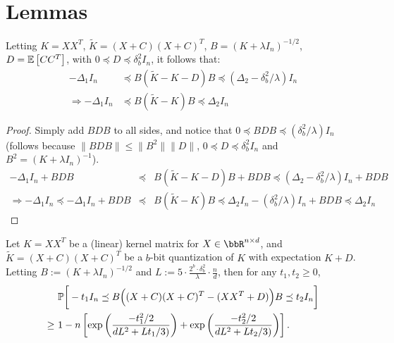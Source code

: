 \documentclass[12pt]{article}
\newcommand{\tK}{\tilde{K}}
\newcommand{\defeq}{:=}
\begin{document}
\section{Lemmas}
\begin{lemma}
	\label{lem1}
	Letting $K=XX^T$, $\tK = (X+C)(X+C)^T$, $B = (K+\lambda I_n)^{-1/2}$, $D = \expect{}{CC^T}$, with $0 \preceq D \preceq \delta_b^2 I_n$, it follows that:
	\begin{align*}
-\Delta_1 I_n &\preceq B (\tK - K - D) B \preceq
(\Delta_2 - \delta^2_b/\lambda) I_n \\
\Longrightarrow -\Delta_1 I_n &\preceq B (\tK - K) B \preceq
\Delta_2 I_n
	\end{align*}
\end{lemma}
\begin{proof}
Simply add $BDB$ to all sides, and notice that $0 \preceq BDB \preceq (\delta_b^2/\lambda) I_n$ (follows because $\|BDB\| \leq \|B^2\| \|D\|$, $0 \preceq D \preceq \delta_b^2 I_n$ and $B^2 = (K+\lambda I_n)^{-1}$).
\begin{eqnarray*}
-\Delta_1 I_n + BDB &\preceq& B (\tK - K - D) B  + BDB \preceq
(\Delta_2 - \delta^2_b/\lambda) I_n  + BDB \\
\Longrightarrow -\Delta_1 I_n \preceq  -\Delta_1 I_n + BDB &\preceq& B (\tK - K) B \preceq
\Delta_2 I_n - (\delta_b^2/\lambda) I_n  + BDB \preceq \Delta_2 I_n
\end{eqnarray*}
\end{proof}


\begin{lemma}
	Let $K=XX^T$ be a (linear) kernel matrix for $X \in\RR^{n \times d}$, and $\tK = (X+C)(X+C)^T$ be a $b$-bit quantization of $K$ with expectation $K+D$.
	Letting $B\defeq (K+\lambda I_n)^{-1/2}$ and $L \defeq 5 \cdot \frac{2^b \cdot \delta_b^2}{\lambda}\cdot  \frac{n}{d}$, then for any $t_1, t_2 \geq 0$,
	\begin{align*}
	&\Prob\bigg[- t_1 I_n \preceq B\Big((X + C)(X + C)^T - (XX^T+D)\Big)B \preceq t_2 I_n\bigg] \\
	\geq\ &1 - n \left[ \exp \left( \frac{-t_1^2/2}{dL^2 +
		Lt_1/3)} \right) + \exp \left(\frac{-t_2^2/2}{dL^2 + Lt_2/3)} \right)  \right].
	\end{align*}
	\label{lem:quantized_concentration_two_sided}
\end{lemma}
\end{document}

